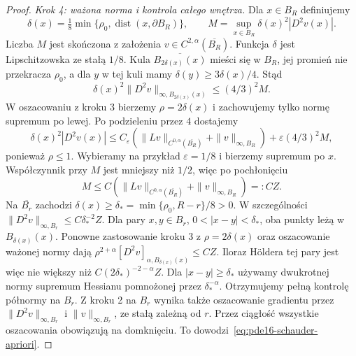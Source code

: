 \begin{proof}
\emph{Krok 4: ważona norma i kontrola całego wnętrza.}
Dla $x\in B_R$ definiujemy
\[
 \delta(x)=\tfrac18\min\{\rho_0,
                 \operatorname{dist}(x,\partial B_R)\},\qquad
 M=\sup_{x\in B_R}\delta(x)^2|D^2v(x)|.
\]
Liczba $M$ jest skończona z założenia
$v\in C^{2,\alpha}(\overline{B_R})$.
Funkcja $\delta$ jest Lipschitzowska ze stałą $1/8$.
Kula $\overline{B_{2\delta(x)}(x)}$ mieści się w $B_R$,
jej promień nie przekracza $\rho_0$, a dla $y$
w tej kuli mamy $\delta(y)\ge3\delta(x)/4$.
Stąd
\[
 \delta(x)^2\|D^2v\|_{\infty,B_{2\delta(x)}(x)}
 \le (4/3)^2 M .
\]
W oszacowaniu z kroku 3 bierzemy $\rho=2\delta(x)$
i zachowujemy tylko normę supremum po lewej.
Po podzieleniu przez $4$ dostajemy
\[
 \delta(x)^2|D^2v(x)|
 \le C_\varepsilon(\|Lv\|_{C^{0,\alpha}(\overline{B_R})}
                  +\|v\|_{\infty,B_R})
       +\varepsilon(4/3)^2 M,
\]
ponieważ $\rho\le1$. Wybieramy na przykład
$\varepsilon=1/8$ i bierzemy supremum po $x$.
Współczynnik przy $M$ jest mniejszy niż $1/2$,
więc po pochłonięciu
\[
 M\le C(\|Lv\|_{C^{0,\alpha}(\overline{B_R})}
                  +\|v\|_{\infty,B_R})=:C Z.
\]
Na $\overline{B_r}$ zachodzi
$\delta(x)\ge\delta_*=\min\{\rho_0,R-r\}/8>0$.
W szczególności $\|D^2v\|_{\infty,B_r}\le C\delta_*^{-2}Z$.
Dla pary $x,y\in B_r$, $0<|x-y|<\delta_*$,
oba punkty leżą w $B_{\delta(x)}(x)$.
Ponowne zastosowanie kroku 3 z $\rho=2\delta(x)$
oraz oszacowanie ważonej normy dają
$\rho^{2+\alpha}[D^2v]_{\alpha,B_{\delta(x)}(x)}
\le C Z$. Iloraz Höldera tej pary jest więc
nie większy niż $C(2\delta_*)^{-2-\alpha}Z$.
Dla $|x-y|\ge\delta_*$ używamy dwukrotnej normy
supremum Hessianu pomnożonej przez $\delta_*^{-\alpha}$.
Otrzymujemy pełną kontrolę półnormy na $B_r$.
Z kroku 2 na $B_r$ wynika także oszacowanie gradientu
przez $\|D^2v\|_{\infty,B_r}$ i $\|v\|_{\infty,B_r}$,
ze stałą zależną od $r$. Przez ciągłość wszystkie
oszacowania obowiązują na domknięciu.
To dowodzi~\eqref{eq:pde16-schauder-apriori}.
\end{proof}

